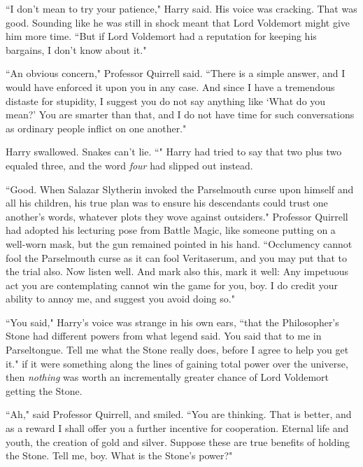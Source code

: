 ``I don't mean to try your patience," Harry said. His voice was cracking. That was good. Sounding like he was still in shock meant that Lord Voldemort might give him more time. ``But if Lord Voldemort had a reputation for keeping his bargains, I don't know about it."

``An obvious concern," Professor Quirrell said. ``There is a simple answer, and I would have enforced it upon you in any case.  And since I have a tremendous distaste for stupidity, I suggest you do not say anything like `What do you mean?' You are smarter than that, and I do not have time for such conversations as ordinary people inflict on one another."

Harry swallowed. Snakes can't lie. ``" Harry had tried to say that two plus two equaled three, and the word \emph{four} had slipped out instead.

``Good. When Salazar Slytherin invoked the Parselmouth curse upon himself and all his children, his true plan was to ensure his descendants could trust one another's words, whatever plots they wove against outsiders." Professor Quirrell had adopted his lecturing pose from Battle Magic, like someone putting on a well-worn mask, but the gun remained pointed in his hand. ``Occlumency cannot fool the Parselmouth curse as it can fool Veritaserum, and you may put that to the trial also. Now listen well.  And mark also this, mark it well:  Any impetuous act you are contemplating cannot win the game for you, boy. I do credit your ability to annoy me, and suggest you avoid doing so."

``You said," Harry's voice was strange in his own ears, ``that the Philosopher's Stone had different powers from what legend said. You said that to me in Parseltongue. Tell me what the Stone really does, before I agree to help you get it." if it were something along the lines of gaining total power over the universe, then \emph{nothing} was worth an incrementally greater chance of Lord Voldemort getting the Stone.

``Ah," said Professor Quirrell, and smiled. ``You are thinking. That is better, and as a reward I shall offer you a further incentive for cooperation. Eternal life and youth, the creation of gold and silver. Suppose these are true benefits of holding the Stone. Tell me, boy. What is the Stone's power?"

